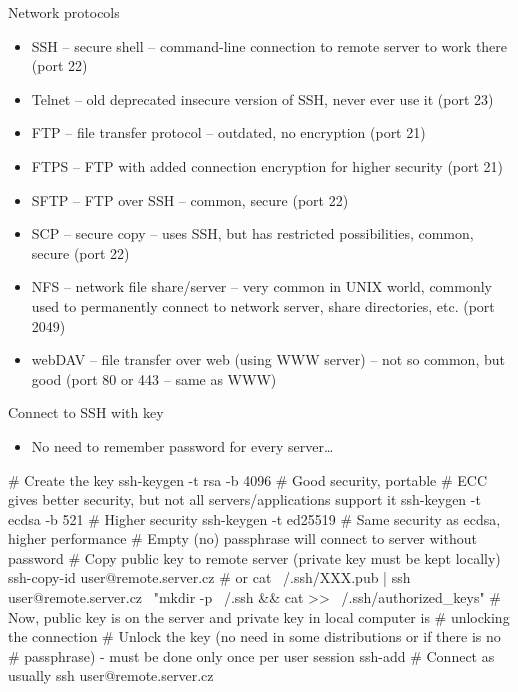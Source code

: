 \documentclass[compress, ucs, xelatex, 11pt, xcolor=svgnames,
  hyperref={
    bookmarks=true,
    unicode=true,
    colorlinks=true,
    pdftitle={Linux, command line and MetaCentrum},
    plainpages=false,
    pdfauthor={Vojtech Zeisek},
    pdfsubject={Course about use of Linux command line, writing shell scripts and using MetaCentrum of CESNET},
    pdfcreator={XeLaTeX},
    pdfkeywords={Linux, GNU, BASH, shell, command line, MetaCentrum},
    linkcolor=DarkRed,
    anchorcolor=DarkBlue,
    citecolor=Indigo,
    filecolor=NavyBlue,
    menucolor=DarkMagenta,
    urlcolor=DarkBlue,
    pdftex},
  url={hyphens, lowtilde} %
  ]{beamer}
\begin{document}
\begin{frame}{Network protocols}
  \begin{itemize}
    \item SSH -- secure shell -- command-line connection to remote server to work there (port 22)
    \item Telnet -- old deprecated insecure version of SSH, never ever use it (port 23)
    \item FTP -- file transfer protocol -- outdated, no encryption (port 21)
    \item FTPS -- FTP with added connection encryption for higher security (port 21)
    \item SFTP -- FTP over SSH -- common, secure (port 22)
    \item SCP -- secure copy -- uses SSH, but has restricted possibilities, common, secure (port 22)
    \item NFS -- network file share/server -- very common in UNIX world, commonly used to permanently connect to network server, share directories, etc. (port 2049)
    \item webDAV -- file transfer over web (using WWW server) -- not so common, but good (port 80 or 443 -- same as WWW)
  \end{itemize}
\end{frame}

\begin{frame}[fragile]{Connect to SSH with key}
  \begin{itemize}
    \item No need to remember password for every server\ldots
  \end{itemize}
  \begin{bashcode}
    # Create the key
    ssh-keygen -t rsa -b 4096 # Good security, portable
    # ECC gives better security, but not all servers/applications support it
    ssh-keygen -t ecdsa -b 521 # Higher security
    ssh-keygen -t ed25519 # Same security as ecdsa, higher performance
    # Empty (no) passphrase will connect to server without password
    # Copy public key to remote server (private key must be kept locally)
    ssh-copy-id user@remote.server.cz # or
    cat ~/.ssh/XXX.pub | ssh user@remote.server.cz \
      "mkdir -p ~/.ssh && cat >> ~/.ssh/authorized_keys"
    # Now, public key is on the server and private key in local computer is
    # unlocking the connection
    # Unlock the key (no need in some distributions or if there is no
    # passphrase) - must be done only once per user session
    ssh-add
    # Connect as usually
    ssh user@remote.server.cz
  \end{bashcode}
\end{frame}
\end{document}
